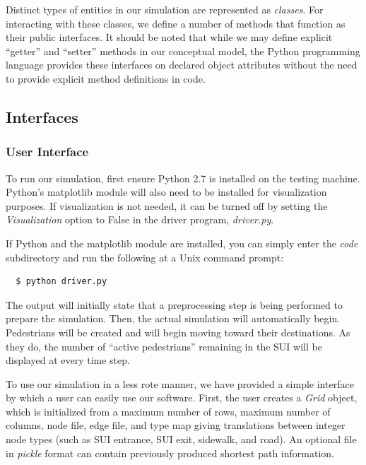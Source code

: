 \documentclass[12pt]{article}
\begin{document}
Distinct types of entities in our simulation are represented as
\textit{classes}. For interacting with these classes, we define a number of
methods that function as their public interfaces. It should be noted that while
we may define explicit ``getter'' and ``setter'' methods in our conceptual model,
the Python programming language provides these interfaces on declared object
attributes without the need to provide explicit method definitions in code.

\subsection{Interfaces}

\subsubsection{User Interface}

To run our simulation, first ensure Python 2.7 is installed on the testing
machine. Python's matplotlib module will also need to be installed for
visualization purposes. If visualization is not needed, it can be turned
off by setting the \textit{Visualization} option to False in the driver program,
\textit{driver.py}.

If Python and the matplotlib module are installed, you can simply enter the
\textit{code} subdirectory and run the following at a Unix command prompt:

\begin{lstlisting}
  $ python driver.py
\end{lstlisting}

The output will initially state that a preprocessing step is being performed
to prepare the simulation. Then, the actual simulation will automatically begin.
Pedestrians will be created and will begin moving toward their destinations. As
they do, the number of ``active pedestrians'' remaining in the SUI will be
displayed at every time step.

To use our simulation in a less rote manner, we have provided a simple interface
by which a user can easily use our software. First, the user creates a
\textit{Grid} object, which is initialized from a maximum number of rows,
maximum number of columns, node file, edge file, and type map giving
translations between integer node types (such as SUI entrance, SUI exit,
sidewalk, and road). An optional file in \textit{pickle} format can contain
previously produced shortest path information.
\end{document}
